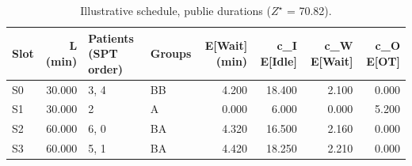 \begin{table}[htbp]
\caption{Illustrative schedule, publie durations ($Z^\star$ = 70.82).}
\label{tab:planning-publie}
\begin{tabular}{lrllrrrr}
\toprule
Slot & L (min) & Patients (SPT order) & Groups & E[Wait] (min) & c\_I E[Idle] & c\_W E[Wait] & c\_O E[OT] \\
\midrule
S0 & 30.000 & 3, 4 & BB & 4.200 & 18.400 & 2.100 & 0.000 \\
S1 & 30.000 & 2 & A & 0.000 & 6.000 & 0.000 & 5.200 \\
S2 & 60.000 & 6, 0 & BA & 4.320 & 16.500 & 2.160 & 0.000 \\
S3 & 60.000 & 5, 1 & BA & 4.420 & 18.250 & 2.210 & 0.000 \\
\bottomrule
\end{tabular}
\end{table}

